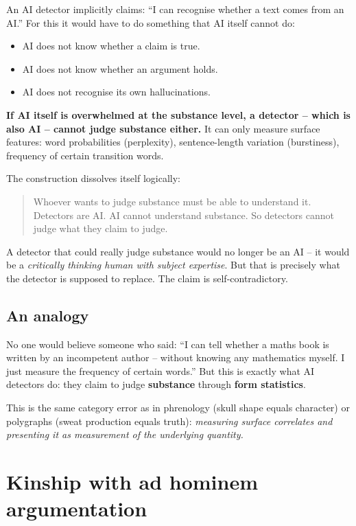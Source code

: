 An AI detector implicitly claims: \enquote{I can recognise whether
a text comes from an AI.} For this it would have to do something
that AI itself cannot do:

\begin{itemize}[leftmargin=2em,itemsep=2pt,topsep=2pt]
  \item AI does not know whether a claim is true.
  \item AI does not know whether an argument holds.
  \item AI does not recognise its own hallucinations.
\end{itemize}

\textbf{If AI itself is overwhelmed at the substance level, a
detector -- which is also AI -- cannot judge substance either.}
It can only measure surface features: word probabilities
(perplexity), sentence-length variation (burstiness), frequency
of certain transition words.

The construction dissolves itself logically:

\begin{quote}
Whoever wants to judge substance must be able to understand it.
Detectors are AI. AI cannot understand substance. So detectors
cannot judge what they claim to judge.
\end{quote}

A detector that could really judge substance would no longer be an
AI -- it would be a \emph{critically thinking human with subject
expertise}. But that is precisely what the detector is supposed to
replace. The claim is self-contradictory.

\subsection{An analogy}

No one would believe someone who said: \enquote{I can tell whether
a maths book is written by an incompetent author -- without knowing
any mathematics myself. I just measure the frequency of certain
words.} But this is exactly what AI detectors do: they claim to
judge \textbf{substance} through \textbf{form statistics}.

This is the same category error as in phrenology (skull shape
equals character) or polygraphs (sweat production equals truth):
\emph{measuring surface correlates and presenting it as measurement
of the underlying quantity.}

\section{Kinship with ad hominem argumentation}

